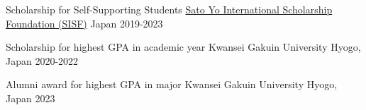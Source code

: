 
\begin{cvhonors}

  \cvhonor
    {Scholarship for Self-Supporting Students} %
    {\href{https://sisf.or.jp/ja/}{Sato Yo International Scholarship Foundation (SISF)}} %
    {Japan} %
    {2019-2023} %

  \cvhonor
    {Scholarship for highest GPA in academic year} %
    {Kwansei Gakuin University} %
    {Hyogo, Japan} %
    {2020-2022} %

  \cvhonor
    {Alumni award for highest GPA in major} %
    {Kwansei Gakuin University} %
    {Hyogo, Japan} %
    {2023} %

\end{cvhonors}
